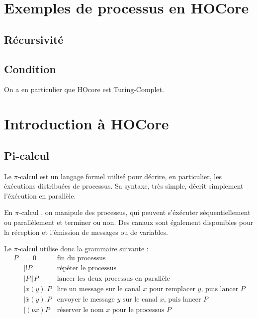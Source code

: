 \documentclass{article}
\def\pic{$\pi$-calcul }
\begin{document}
\section{Exemples de processus en HOCore}
\subsection{Récursivité}

\subsection{Condition}

On a en particulier que HOcore est Turing-Complet. %







\newpage
\section{Introduction à HOCore}
\subsection{Pi-calcul}
Le \pic est un langage formel utilisé pour décrire, en particulier, les éxécutions distribuées de processus. Sa syntaxe, très simple, décrit simplement l'éxécution en parallèle.

En \pic, on manipule des processus, qui peuvent s'éxécuter séquentiellement ou parallèlement et terminer ou non. Des canaux sont également disponibles pour la réception et l'émission de messages ou de variables.

Le \pic utilise donc la grammaire suivante :
\begin{align*}
P &= 0 & \text{fin du processus} \\
&| !P &\text{répéter le processus}\\
&| P||P &\text{lancer les deux processus en parallèle}\\
&| x(y).P &\text{lire un message sur le canal $x$ pour remplacer $y$, puis lancer $P$}\\
&| \bar{x}(y).P &\text{envoyer le message $y$ sur le canal $x$, puis lancer $P$}\\
&| (\nu x)P &\text{réserver le nom $x$ pour le processus $P$}\\
\end{align*}
\end{document}
